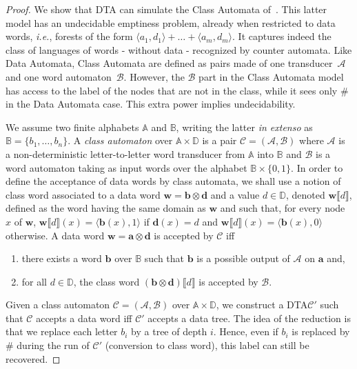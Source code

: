 \documentclass{CSML}
\newcommand\wdad{\textup{DTA}\xspace}
\newcommand\A{\ensuremath{\mathbb{A}}\xspace}
\newcommand\B{\mathbb{B}}
\newcommand\D{\mathbb{D}}
\newcommand\Aa{\mathcal{A}}
\newcommand\Ba{\mathcal{B}}
\newcommand\Ca{\mathcal{C}}
\newcommand\tree{\boldsymbol{t}}
\newcommand\atree{\boldsymbol{a}}
\newcommand\btree{\boldsymbol{b}}
\newcommand\dtree{\boldsymbol{d}}
\newcommand\wtree{\boldsymbol{w}}
\begin{document}
\begin{proof}
We show that \wdad can simulate the Class Automata
of~\cite{BojanczykLasota10lics}.  This latter model has an undecidable
emptiness problem, already when restricted to data words, 
\textit{i.e.}, forests of the form $\langle a_{1}, d_1\rangle + \ldots + \langle a_{m}, d_m\rangle$.  
It captures indeed the class of languages of words - without data - recognized by counter automata.
Like Data Automata, Class Automata are defined as pairs made of one transducer~$\Aa$ and one word automaton~$\Ba$.
However, 
the $\Ba$ part in the Class Automata model has access to the label of the nodes that are not in the
class, while it sees only $\#$ in the Data Automata case. 
This extra power implies undecidability.


\newcommand\classproj{\llbracket d \rrbracket}
\newcommand\classtreeprime{\tree'\classproj}
\newcommand\classword{\wtree\classproj}

We assume two finite alphabets $\A$ and $\B$, writing the latter
\textit{in extenso} as $\B = \{ b_1,\ldots, b_n \}$.  
A \emph{class automaton} over
$\A \times \D$ is a pair $\Ca = (\Aa, \Ba)$ where $\Aa$ is a non-deterministic
letter-to-letter word transducer from $\A$ into $\B$ and $\Ba$ is a word
automaton taking as input words over the alphabet $\B \times \{ 0,1 \}$.
In order to define the acceptance of data words by class automata, 
we shall use a notion of class word associated to a data word $\wtree = \btree\otimes\dtree$
and a value $d \in \D$, denoted $\classword$, defined as 
the word having the same domain as $\wtree$
and such that, for every node $x$ of $\wtree$, 
$\classword(x) = \langle \btree(x), 1\rangle$ if $\dtree(x) = d$
and 
$\classword(x) = \langle \btree(x), 0\rangle$ otherwise.
A data word $\wtree = \atree\otimes\dtree$ is accepted by $\Ca$ iff
\begin{enumerate} 
\item there exists a word $\btree$ over $\B$ such that
$\btree$ is a possible output of $\Aa$ on $\atree$ and,
\item for all $d\in\D$, the class word $(\btree\otimes \dtree)\classproj$ 
is accepted by $\Ba$.
\end{enumerate}

Given a class automaton $\Ca= (\Aa, \Ba)$ over $\A\times\D$, we construct a \wdad $\Ca'$ such that $\Ca$
accepts a data word iff $\Ca'$ accepts a data tree.
The idea of the reduction is that we replace each letter $b_i$ by a tree of
depth $i$. Hence, even if $b_i$ is replaced by $\#$ during the run of $\Ca'$ (conversion to class word),
this label can still be recovered.


\end{proof}
\end{document}
